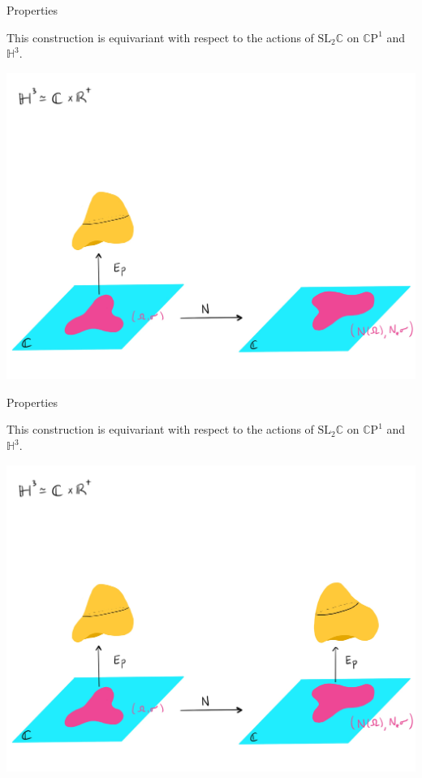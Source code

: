 \documentclass[professionalfont]{beamer}
\newcommand{\C}{\mathbb{C}}
\newcommand{\CP}{\mathbb{C}\mathrm{P}}
\renewcommand{\H}{\mathbb{H}}
\begin{document}


\begin{frame}{Properties}

This construction is equivariant with respect to the actions of $\mathrm{SL}_2\C$ on $\CP^1$ and $\H^3$. 

\centering\includegraphics[scale=0.1]{Equivariant-3.jpg}


\end{frame}




\begin{frame}{Properties}

This construction is equivariant with respect to the actions of $\mathrm{SL}_2\C$ on $\CP^1$ and $\H^3$. 

\centering\includegraphics[scale=0.1]{Equivariant-4.jpg}

\end{frame}
\end{document}
